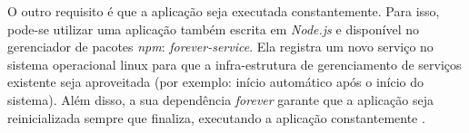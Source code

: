 O outro requisito é que a aplicação seja executada constantemente. Para isso,
pode-se utilizar uma aplicação também escrita em \emph{Node.js} e disponível no
gerenciador de pacotes \emph{npm}: \emph{forever-service}. Ela registra um novo serviço no sistema operacional
linux para que a infra-estrutura de gerenciamento de serviços	existente seja
aproveitada (por exemplo: início automático após o início do sistema). Além disso, a sua dependência
\emph{forever} garante que a aplicação seja reinicializada sempre que finaliza,
executando a aplicação constantemente \cite{forever-service}.
